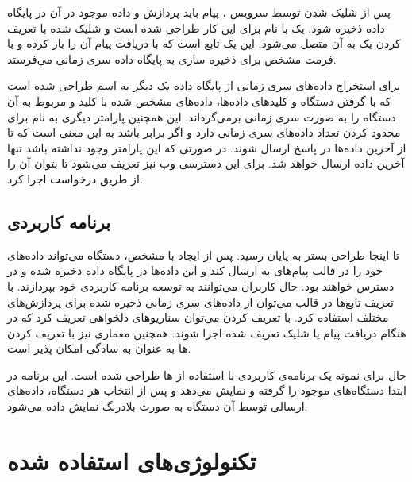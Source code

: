 پس از شلیک شدن  توسط سرویس ، پیام باید پردازش و داده موجود در آن در پایگاه داده ذخیره شود. یک  با نام  برای این کار طراحی شده‌ است و  شلیک شده با تعریف کردن یک  به آن متصل می‌شود. این  یک تابع است که با دریافت پیام آن را باز کرده و با فرمت مشخص برای ذخیره سازی به پایگاه داده سری زمانی می‌فرستد.

برای استخراج داده‌های سری زمانی از پایگاه داده یک  دیگر به اسم  طراحی شده است که با گرفتن  دستگاه و کلید‌های داده‌ها، داده‌های مشخص شده با کلید و مربوط به آن دستگاه را به صورت سری زمانی برمی‌گرداند. این  همچنین پارامتر دیگری به نام  برای محدود کردن تعداد داده‌های سری زمانی دارد و اگر برابر  باشد به این معنی است که  تا از آخرین داده‌ها در پاسخ ارسال شوند. در صورتی که این پارامتر وجود نداشته باشد تنها آخرین داده ارسال خواهد شد. برای این  دسترسی وب نیز تعریف می‌شود تا بتوان آن را از طریق درخواست  اجرا کرد.

\subsection{برنامه کاربردی}

تا اینجا طراحی بستر به پایان رسید. پس از ایجاد  با  مشخص، دستگاه می‌تواند داده‌های خود را در قالب پیام‌های  به  ارسال کند و این داده‌ها در پایگاه داده ذخیره شده و در دسترس خواهند بود. حال کاربران می‌توانند به توسعه برنامه کاربردی خود بپردازند. با تعریف تابع‌ها در قالب  می‌توان از داده‌های سری زمانی ذخیره شده برای پردازش‌های مختلف استفاده کرد. با تعریف کردن  می‌توان سناریوهای دلخواهی تعریف کرد که در هنگام دریافت پیام یا شلیک  تعریف شده اجرا شوند. همچنین معماری  نیز با تعریف کردن  ها به عنوان  به سادگی امکان پذیر است.

حال برای نمونه یک برنامه‌ی کاربردی با استفاده از  ها طراحی شده است. این برنامه در ابتدا دستگاه‌های موجود را گرفته و نمایش می‌دهد و پس از انتخاب هر دستگاه، داده‌های ارسالی توسط آن دستگاه به صورت بلادرنگ نمایش داده می‌شود.

\newpage

\section{تکنولوژی‌های استفاده شده}

\subsection{}

